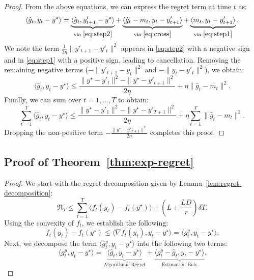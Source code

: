 \documentclass[journal,onecolumn]{IEEEtran}
\theoremstyle{plain}
\theoremstyle{definition}
\theoremstyle{remark}
\newcommand{\regret}{\mathfrak{R}}
\begin{document}
{\begin{proof}
    From the above equations, we can express the regret term at time $t$ as:
    \begin{equation*}
        \langle \hat g_{t}, y_{t}-y^{\star}\rangle = \underbrace{\langle \hat
        g_t, y'_{t+1}-y^\star\rangle}_{\text{via } \eqref{eq:step2}}+ \underbrace{\langle
        \hat g_t-m_t, y_t-y'_{t+1}\rangle}_{\text{via } \eqref{eq:cross}}+ \underbrace{\langle
        m_t, y_t-y'_{t+1}\rangle}_{\text{via } \eqref{eq:step1}}.
    \end{equation*}
    We note the term $\frac{1}{2\eta} \|y'_{t+1}-y'_{t}\|^{2}$ appears in \eqref{eq:step2} with a negative sign and in \eqref{eq:step1} with a positive sign, leading to cancellation. Removing the remaining negative terms ($-\|y'_{t+1}-y_{t}\|^{2}$ and $-\|y_{t}-y'_{t}\|^{2}$), we obtain:
    \begin{equation*}
        \langle \hat g_{t}, y_{t}-y^{\star}\rangle \le \frac{\|y^{\star}-y'_{t}\|^{2}-
        \|y^{\star}-y'_{t+1}\|^{2}}{2\eta}+ \eta\|\hat g_{t}-m_{t}\|^{2}.
    \end{equation*}
    Finally, we can sum over $t=1,\ldots,T$ to obtain:
    \begin{equation*}
        \sum_{t=1}^{T}\langle \hat g_{t}, y_{t}-y^{\star}\rangle \le \frac{\|y^{\star}-y'_{1}\|^{2}-
        \|y^{\star}-y'_{T+1}\|^{2}}{2\eta}+ \eta\sum_{t=1}^{T}\|\hat g_{t}-m_{t}\|
        ^{2}.
    \end{equation*}
    Dropping the non-positive term $-\frac{\|y^{\star}-y'_{T+1}\|^{2}}{2\eta}$ completes this
    proof.
\end{proof}

\subsection{Proof of Theorem~\ref{thm:exp-regret}}
\label{app:proof-expregret}
\begin{proof}
    We start with the regret decomposition given by Lemma~\ref{lem:regret-decomposition}:
    \begin{equation*}
        \regret_{T}\le \sum_{t=1}^{T}\big(f_{t}(y_{t})-f_{t}(y^{\star})\big) + \left(L+\frac{LD}{r}\right)\delta T.
    \end{equation*}
    Using the convexity of $f_{t}$, we establish the following:
    \begin{equation*}
        f_{t}(y_{t})-f_{t}(y^{\star}) \le \langle \nabla f_{t}(y_{t}), y_{t}-y^{\star}
        \rangle = \langle g_{t}^{y}, y_{t}-y^{\star}\rangle.
    \end{equation*}
    Next, we decompose the term $\langle g_{t}^{y}, y_{t}-y^{\star}\rangle$ into the following two terms:
    \begin{equation*}
        \langle g_{t}^{y}, y_{t}-y^{\star}\rangle=\underbrace{\langle \hat g_t, y_t-y^\star\rangle}
        _{\text{Algorithmic Regret}}+\underbrace{\langle g_t^y-\hat g_t, y_t-y^\star\rangle}
        _{\text{Estimation Bias}}.
    \end{equation*}


\end{proof}}
\end{document}
